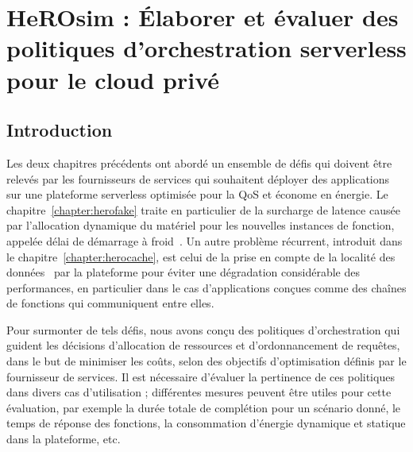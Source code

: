 \chapter{HeROsim : Élaborer et évaluer des politiques d'orchestration serverless pour le cloud privé}
\label{chapter:herosim}



\section{Introduction}
\label{section:herosim-introduction}

Les deux chapitres précédents ont abordé un ensemble de défis qui doivent être relevés par les fournisseurs de services qui souhaitent déployer des applications sur une plateforme serverless optimisée pour la \gls{QoS} et économe en énergie. Le chapitre~\ref{chapter:herofake} traite en particulier de la surcharge de latence causée par l'allocation dynamique du matériel pour les nouvelles instances de fonction, appelée délai de démarrage à froid~\cite{vahidiniaColdStartServerless2020}. Un autre problème récurrent, introduit dans le chapitre~\ref{chapter:herocache}, est celui de la prise en compte de la localité des données~\cite{yuFollowingDataNot} par la plateforme pour éviter une dégradation considérable des performances, en particulier dans le cas d'applications conçues comme des chaînes de fonctions qui communiquent entre elles.

Pour surmonter de tels défis, nous avons conçu des politiques d'orchestration qui guident les décisions d'allocation de ressources et d'ordonnancement de requêtes, dans le but de minimiser les coûts, selon des objectifs d'optimisation définis par le fournisseur de services. Il est nécessaire d'évaluer la pertinence de ces politiques dans divers cas d'utilisation ; différentes mesures peuvent être utiles pour cette évaluation, par exemple la durée totale de complétion pour un scénario donné, le temps de réponse des fonctions, la consommation d'énergie dynamique et statique dans la plateforme, etc.


